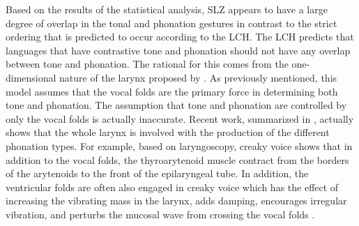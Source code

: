 \documentclass[12pt, letterpaper]{article}
\begin{document}
Based on the results of the statistical analysis, SLZ appears to have a large degree of overlap in the tonal and phonation gestures in contrast to the strict ordering that is predicted to occur according to the LCH. The LCH predicts that languages that have contrastive tone and phonation should not have any overlap between tone and phonation. The rational for this comes from the one-dimensional nature of the larynx proposed by \citet{ladefogedPreliminariesLinguisticPhonetics1971}. As previously mentioned, this model assumes that the vocal folds are the primary force in determining both tone and phonation. The assumption that tone and phonation are controlled by only the vocal folds is actually inaccurate. Recent work, summarized in \citet{eslingVoiceQualityLaryngeal2019}, actually shows that the whole larynx is involved with the production of the different phonation types. For example, based on laryngoscopy, creaky voice shows that in addition to the vocal folds, the thyroarytenoid muscle contract from the borders of the arytenoids to the front of the epilaryngeal tube. In addition, the ventricular folds are often also engaged in creaky voice which has the effect of increasing the vibrating mass in the larynx, adds damping, encourages irregular vibration, and perturbs the mucosal wave from crossing the vocal folds \citep{moisikModelingBiomechanicalInfluence2014}. 
\end{document}

